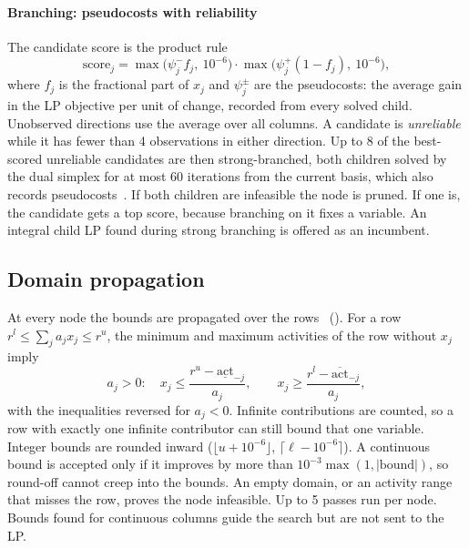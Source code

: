 \paragraph{Branching: pseudocosts with reliability}
The candidate score is the product rule
\begin{equation}\label{eq:score}
  \text{score}_j = \max\bigl(\psi^-_j f_j,\ 10^{-6}\bigr)\cdot\max\bigl(\psi^+_j(1-f_j),\ 10^{-6}\bigr),
\end{equation}
where $f_j$ is the fractional part of $x_j$ and $\psi^\pm_j$ are the pseudocosts: the average gain in
the LP objective per unit of change, recorded from every solved child. Unobserved directions use the
average over all columns. A candidate is \emph{unreliable} while it has fewer than 4 observations in
either direction. Up to 8 of the best-scored unreliable candidates are then strong-branched, both
children solved by the dual simplex for at most 60 iterations from the current basis, which also
records pseudocosts~\cite{achterberg2005}. If both children are infeasible the node is pruned. If one
is, the candidate gets a top score, because branching on it fixes a variable. An integral child LP
found during strong branching is offered as an incumbent.

\subsection{Domain propagation}\label{sec:propagation}
At every node the bounds are propagated over the rows~\cite{savelsbergh1994,achterberg2007}
(). For a row $r^l\le\sum_j a_jx_j\le r^u$, the minimum and maximum activities
of the row without $x_j$ imply
\begin{equation}\label{eq:propagate}
  a_j>0:\quad x_j\le \frac{r^u-\underline{\text{act}}_{-j}}{a_j},\qquad x_j\ge\frac{r^l-\overline{\text{act}}_{-j}}{a_j},
\end{equation}
with the inequalities reversed for $a_j<0$. Infinite contributions are counted, so a row with exactly
one infinite contributor can still bound that one variable. Integer bounds are rounded inward
($\lfloor u+10^{-6}\rfloor$, $\lceil \ell-10^{-6}\rceil$). A continuous bound is accepted only if it
improves by more than $10^{-3}\max(1,|\text{bound}|)$, so round-off cannot creep into the bounds.
An empty domain, or an activity range that misses the row, proves the node infeasible. Up to 5 passes
run per node. Bounds found for continuous columns guide the search but are not sent to the LP.


